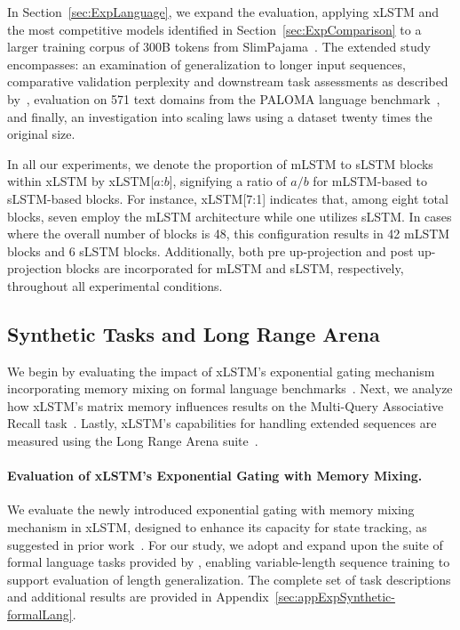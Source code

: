 In Section~\ref{sec:ExpLanguage}, we expand the evaluation, applying xLSTM and the most competitive models identified in Section~\ref{sec:ExpComparison} to a larger training corpus of 300B tokens from SlimPajama~\citep{Soboleva:23}. The extended study encompasses: an examination of generalization to longer input sequences, comparative validation perplexity and downstream task assessments as described by~\citep{Sutawika:24}, evaluation on 571 text domains from the PALOMA language benchmark~\citep{Magnusson:23arxivshort}, and finally, an investigation into scaling laws using a dataset twenty times the original size.

\label{sec:xlstm_blocks_notation}
In all our experiments, we denote the proportion of mLSTM to sLSTM blocks within xLSTM by xLSTM[$a$:$b$], signifying a ratio of $a/b$ for mLSTM-based to sLSTM-based blocks. For instance, xLSTM[7:1] indicates that, among eight total blocks, seven employ the mLSTM architecture while one utilizes sLSTM. In cases where the overall number of blocks is 48, this configuration results in 42 mLSTM blocks and 6 sLSTM blocks. Additionally, both pre up-projection and post up-projection blocks are incorporated for mLSTM and sLSTM, respectively, throughout all experimental conditions.

\subsection{Synthetic Tasks and Long Range Arena}
\label{sec:ExpSyntethic}
We begin by evaluating the impact of xLSTM's exponential gating mechanism incorporating memory mixing on formal language benchmarks~\citep{Deletang:23}. Next, we analyze how xLSTM's matrix memory influences results on the Multi-Query Associative Recall task~\citep{Arora:23arxiv}. Lastly, xLSTM's capabilities for handling extended sequences are measured using the Long Range Arena suite~\citep{Tay:21}.

\paragraph{Evaluation of xLSTM's Exponential Gating with Memory Mixing.} We evaluate the newly introduced exponential gating with memory mixing mechanism in xLSTM, designed to enhance its capacity for state tracking, as suggested in prior work~\citep{Merrill:24, Merrill:23}. For our study, we adopt and expand upon the suite of formal language tasks provided by \citet{Deletang:23}, enabling variable-length sequence training to support evaluation of length generalization. The complete set of task descriptions and additional results are provided in Appendix~\ref{sec:appExpSynthetic-formalLang}. 

